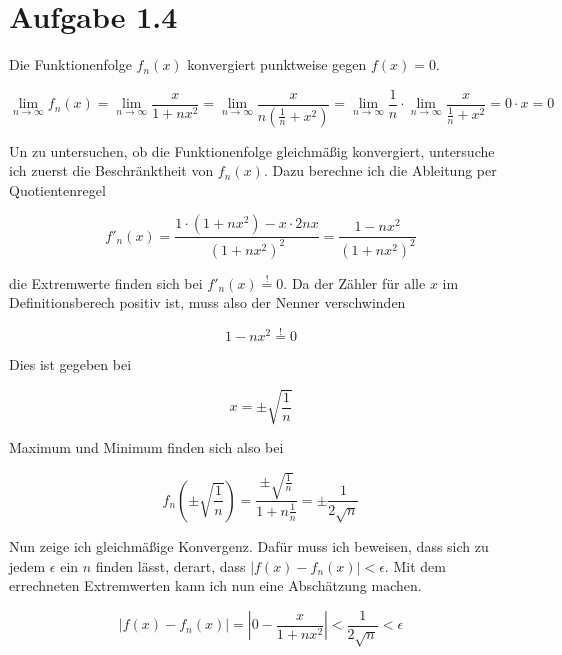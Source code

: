 \documentclass[a4paper,german,12pt,smallheadings]{scrartcl}
\begin{document}
\section*{Aufgabe 1.4}

Die Funktionenfolge $f_n(x)$ konvergiert punktweise gegen $f(x) = 0$.

\begin{equation*}
  \lim_{n \to \infty} f_n(x) = \lim_{n \to \infty} \frac{x}{1+nx^2} = \lim_{n \to \infty} \frac{x}{n \left(\frac{1}{n} + x^2\right)} = \lim_{n \to \infty} \frac{1}{n} \cdot \lim_{n \to \infty} \frac{x}{\frac{1}{n} + x^2} = 0 \cdot x = 0
\end{equation*}

Un zu untersuchen, ob die Funktionenfolge gleichmäßig konvergiert, untersuche ich zuerst die Beschränktheit von $f_n(x)$. Dazu berechne ich die Ableitung per Quotientenregel

\begin{equation*}
  f'_n(x) = \frac{1 \cdot (1+nx^2) - x \cdot 2nx}{(1+nx^2)^2} = \frac{1-nx^2}{(1+nx^2)^2}
\end{equation*}

die Extremwerte finden sich bei $f'_n(x) \overset{!}{=} 0$. Da der Zähler für
alle $x$ im Definitionsberech positiv ist, muss also der Nenner verschwinden

\begin{equation*}
  1-nx^2 \overset{!}{=} 0
\end{equation*}

Dies ist gegeben bei

\begin{equation}
  x = \pm \sqrt{\frac{1}{n}}
\end{equation}

Maximum und Minimum finden sich also bei

\begin{equation*}
  f_n\left(\pm\sqrt{\frac{1}{n}}\right) = \frac{\pm\sqrt{\frac{1}{n}}}{1+n\frac{1}{n}} = \pm\frac{1}{2\sqrt{n}}
\end{equation*}

Nun zeige ich gleichmäßige Konvergenz. Dafür muss ich beweisen, dass sich zu
jedem $\epsilon$ ein $n$ finden lässt, derart, dass $\left| f(x) - f_n(x)
\right| < \epsilon$. Mit dem errechneten Extremwerten kann ich nun eine
Abschätzung machen.

\begin{equation*}
  \left| f(x) - f_n(x) \right| = \left|0-\frac{x}{1+nx^2}\right| < \frac{1}{2\sqrt{n}} < \epsilon
\end{equation*}
\end{document}
